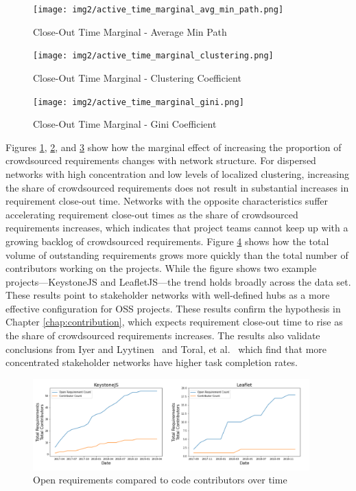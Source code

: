 \begin{figure}
  \texttt{[image: img2/active\_time\_marginal\_avg\_min\_path.png]}
\caption{Close-Out Time Marginal - Average Min Path}
\label{active_time_marginal_avg_min_path}
\end{figure}

\begin{figure}
  \texttt{[image: img2/active\_time\_marginal\_clustering.png]}
\caption{Close-Out Time Marginal - Clustering Coefficient}
\label{active_time_marginal_clustering}
\end{figure}

\begin{figure}
  \texttt{[image: img2/active\_time\_marginal\_gini.png]}
\caption{Close-Out Time Marginal - Gini Coefficient}
\label{active_time_marginal_gini}
\end{figure}

Figures \ref{active_time_marginal_avg_min_path}, \ref{active_time_marginal_clustering}, and \ref{active_time_marginal_gini} show how the marginal effect of increasing the proportion of crowdsourced requirements changes with network structure. For dispersed networks with high concentration and low levels of localized clustering, increasing the share of crowdsourced requirements does not result in substantial increases in requirement close-out time. Networks with the opposite characteristics suffer accelerating requirement close-out times as the share of crowdsourced requirements increases, which indicates that project teams cannot keep up with a growing backlog of crowdsourced requirements. Figure \ref{reqs_contributors_over_time} shows how the total volume of outstanding requirements grows more quickly than the total number of contributors working on the projects. While the figure shows two example projects---KeystoneJS and LeafletJS---the trend holds broadly across the data set. These results point to stakeholder networks with well-defined hubs as a more effective configuration for OSS projects. These results confirm the hypothesis in Chapter \ref{chap:contribution}, which expects requirement close-out time to rise as the share of crowdsourced requirements increases. The results also validate conclusions from Iyer and Lyytinen~\cite{iyer} and Toral, et al.~\cite{toral} which find that more concentrated stakeholder networks have higher task completion rates.

\begin{figure}
  \includegraphics[width=0.95\textwidth]{img/reqs_contributors_over_time.PNG}
\caption{Open requirements compared to code contributors over time}
\label{reqs_contributors_over_time}
\end{figure}


